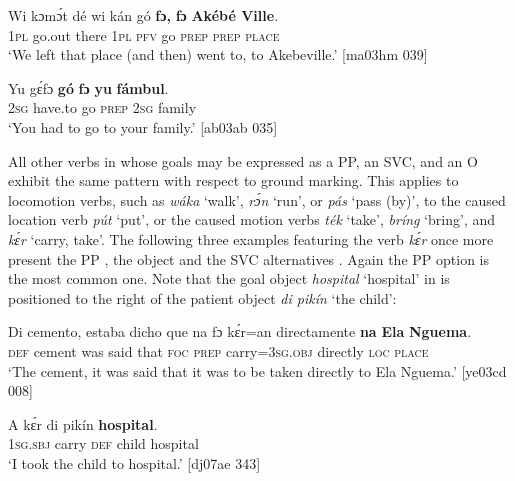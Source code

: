 \ea%
    \label{ex:key:955}
    \gll Wi  kɔmɔ́t  dé    wi  kán  gó  \textbf{fɔ,}  \textbf{fɔ}  \textbf{Akébé Ville}.\\
\textsc{1pl}  go.out  there  \textsc{1pl}  \textsc{pfv}  go  \textsc{prep}  \textsc{prep}  \textsc{place}\\

\glt ‘We left that place (and then) went to, to Akebeville.’ [ma03hm 039]
\z


\ea%
    \label{ex:key:956}
    \gll Yu  gɛ́fɔ    \textbf{gó}  \textbf{fɔ}  \textbf{yu}  \textbf{fámbul}.\\
\textsc{2sg}  have.to  go  \textsc{prep}  \textsc{2sg}  family\\

\glt ‘You had to go to your family.’ [ab03ab 035]
\z

All other verbs in  whose goals may be expressed as a PP, an SVC, and an O exhibit the same pattern with respect to ground marking. This applies to locomotion verbs, such as \textit{wáka} ‘walk’, \textit{rɔ́n} ‘run’, or \textit{pás} ‘pass (by)’, to the caused location verb \textit{pút} ‘put’, or the caused motion verbs \textit{ték} ‘take’, \textit{bríng} ‘bring’, and \textit{kɛ́r} ‘carry, take’. The following three examples featuring the verb \textit{kɛ́r} once more present the PP , the object  and the SVC alternatives . Again the PP option is the most common one. Note that the goal object \textit{hospital} ‘hospital’ in  is positioned to the right of the patient object \textit{di pikín} ‘the child’: 


\ea%
    \label{ex:key:957}
    \gll Di  cemento,  estaba  dicho  que    na  fɔ  kɛ́r=an
directamente  \textbf{na}  {\textbf{Ela} \textbf{Nguema}}.\\
\textsc{def}  cement    was    said    that    \textsc{foc}  \textsc{prep}  carry=\textsc{3sg.obj} 
directly    \textsc{loc}  \textsc{place}\\

\glt ‘The cement, it was said that it was to be taken directly to Ela Nguema.’ [ye03cd 008]
\z


\ea%
    \label{ex:key:958}
    \gll A    kɛ́r    di  pikín  \textbf{hospital}.{\fff}\\
\textsc{1sg.sbj}  carry  \textsc{def}  child  hospital\\

\glt ‘I took the child to hospital.’ [dj07ae 343]
\z


